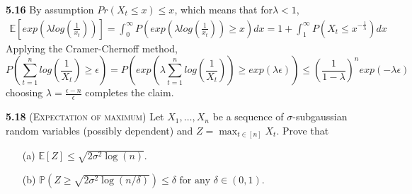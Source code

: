 \noindent \textbf{5.16}
By assumption $Pr(X_t\leq x)\leq x$, which means that for$\lambda <1$,
\begin{align}
\mathbb{E}\left[exp(\lambda log(\frac{1}{x_t}))\right] = \int_0^\infty P(exp(\lambda log(\frac{1}{x_t}))\geq x)dx = 1 +\int_1^\infty P(X_t \leq x^{-\frac{1}{\lambda}})dx
\end{align}
Applying the Cramer-Chernoff method,
$$P\left(\sum_{t=1}^n log(\frac{1}{X_t}) \geq \epsilon\right) = P\left(exp(\lambda \sum_{t=1}^n log(\frac{1}{X_t})) \geq exp(\lambda \epsilon) \right) \leq \left(\frac{1}{1-\lambda}\right)^n exp (-\lambda \epsilon)$$
choosing $\lambda  = \frac{\epsilon-n}{\epsilon}$ completes the claim.







\noindent \textbf{5.18} (\textsc{Expectation of maximum})
Let $X_{1}, \ldots, X_{n}$ be a sequence of $\sigma$-subgaussian random variables
(possibly dependent) and $Z=\max _{t \in[n]} X_{t}$. Prove that

\begin{itemize}
	\item[(a)] $\mathbb{E}[Z] \leq \sqrt{2 \sigma^{2} \log (n)}$.
	\item[(b)] $\mathbb{P}\left(Z \geq \sqrt{2 \sigma^{2} \log (n / \delta)}\right) \leq \delta \text { for any } \delta \in(0,1)$.
\end{itemize}

